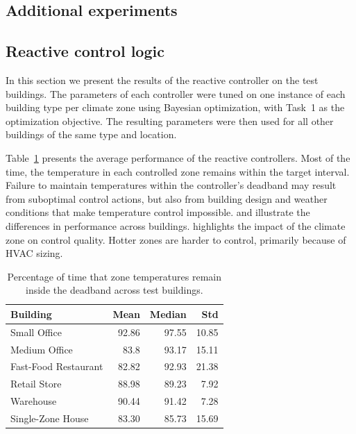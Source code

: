 \documentclass[10pt]{article} %
\begin{document}
\begin{itemize}
\section{Additional experiments}
\label{apdx:additional_experiments}

\subsection{Reactive control logic}
\label{apdx:additional_experiments-reactive_control_logic}

In this section we present the results of the reactive controller on the test buildings. The parameters of each controller were tuned on one instance of each building type per climate zone using Bayesian optimization, with Task~1 as the optimization objective. The resulting parameters were then used for all other buildings of the same type and location.

Table~\ref{tab:baseline_temperature_results} presents the average performance of the reactive controllers. Most of the time, the temperature in each controlled zone remains within the target interval. Failure to maintain temperatures within the controller's deadband may result from suboptimal control actions, but also from building design and weather conditions that make temperature control impossible.  and  illustrate the differences in performance across buildings.  highlights the impact of the climate zone on control quality. Hotter zones are harder to control, primarily because of HVAC sizing.

\begin{table}[h]
\centering
\caption{Percentage of time that zone temperatures remain inside the deadband across test buildings.}
\label{tab:baseline_temperature_results}
\begin{tabular}{l r r r}
\toprule
Building & Mean & Median & Std \\
\midrule
Small Office & 92.86 & 97.55 & 10.85 \\
Medium Office & 83.8 & 93.17 & 15.11 \\
Fast-Food Restaurant & 82.82 & 92.93 & 21.38 \\
Retail Store & 88.98 & 89.23 & 7.92 \\
Warehouse & 90.44 & 91.42 & 7.28 \\
Single-Zone House & 83.30 & 85.73 & 15.69 \\
\bottomrule
\end{tabular}
\end{table}


\end{itemize}
\end{document}
